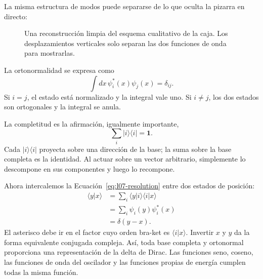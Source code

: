 La misma estructura de modos puede separarse de lo que oculta la pizarra en directo:
\begin{figure}[htbp]
\centering
{}
\caption{Una reconstrucción limpia del esquema cualitativo de la caja. Los desplazamientos verticales solo separan las dos funciones de onda para mostrarlas.}
\end{figure}

La ortonormalidad se expresa como
\begin{equation}
\int dx\,\psi_i^*(x)\psi_j(x)=\delta_{ij}.
\label{eq:l07-orthonormality}
\end{equation}
Si \(i=j\), el estado está normalizado y la integral vale uno. Si \(i\ne j\), los dos estados son ortogonales y la integral se anula.

La completitud es la afirmación, igualmente importante,
\begin{equation}
\sum_i |i\rangle\langle i|=\mathbf 1.
\label{eq:l07-resolution}
\end{equation}
Cada \(|i\rangle\langle i|\) proyecta sobre una dirección de la base; la suma sobre la base completa es la identidad. Al actuar sobre un vector arbitrario, simplemente lo descompone en sus componentes y luego lo recompone.

Ahora intercalemos la Ecuación~\eqref{eq:l07-resolution} entre dos estados de posición:
\begin{align}
\langle y|x\rangle
&=\sum_i\langle y|i\rangle\langle i|x\rangle \\
&=\sum_i\psi_i(y)\psi_i^*(x) \\
&=\delta(y-x).
\label{eq:l07-position-completeness}
\end{align}
El asterisco debe ir en el factor cuyo orden bra-ket es \(\langle i|x\rangle\). Invertir \(x\) y \(y\) da la forma equivalente conjugada compleja. Así, toda base completa y ortonormal proporciona una representación de la delta de Dirac. Las funciones seno, coseno, las funciones de onda del oscilador y las funciones propias de energía cumplen todas la misma función.

